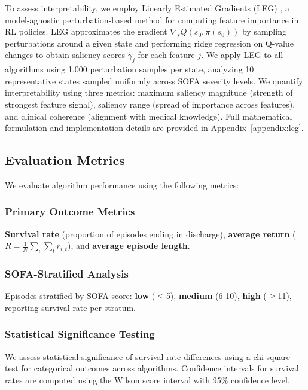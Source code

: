 To assess interpretability, we employ Linearly Estimated Gradients (LEG) \citep{greydanus2018leg}, a model-agnostic perturbation-based method for computing feature importance in RL policies. LEG approximates the gradient $\nabla_s Q(s_0, \pi(s_0))$ by sampling perturbations around a given state and performing ridge regression on Q-value changes to obtain saliency scores $\hat{\gamma}_j$ for each feature $j$. We apply LEG to all algorithms using 1,000 perturbation samples per state, analyzing 10 representative states sampled uniformly across SOFA severity levels. We quantify interpretability using three metrics: maximum saliency magnitude (strength of strongest feature signal), saliency range (spread of importance across features), and clinical coherence (alignment with medical knowledge). Full mathematical formulation and implementation details are provided in Appendix~\ref{appendix:leg}.

\subsection{Evaluation Metrics}\label{sec:methods:eval}

We evaluate algorithm performance using the following metrics:

\subsubsection{Primary Outcome Metrics}

\textbf{Survival rate} (proportion of episodes ending in discharge), \textbf{average return} ($\bar{R} = \frac{1}{N} \sum_i \sum_t r_{i,t}$), and \textbf{average episode length}.

\subsubsection{SOFA-Stratified Analysis}

Episodes stratified by SOFA score: \textbf{low} ($\leq$5), \textbf{medium} (6-10), \textbf{high} ($\geq$11), reporting survival rate per stratum.

\subsubsection{Statistical Significance Testing}

We assess statistical significance of survival rate differences using a chi-square test for categorical outcomes across algorithms. Confidence intervals for survival rates are computed using the Wilson score interval with 95\% confidence level.

